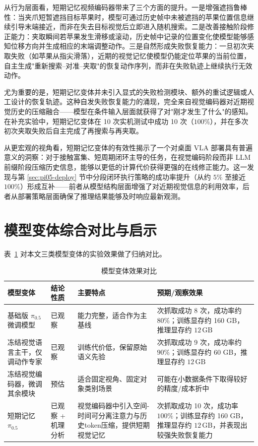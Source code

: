 从行为层面看，短期记忆视频编码器带来了三个方面的提升。一是增强遮挡鲁棒性：当夹爪短暂遮挡目标苹果时，模型可通过历史帧中未被遮挡的苹果位置信息继续引导末端接近，而非在失去目标视觉后立即进入随机搜索。二是改善接触阶段修正能力：夹取瞬间若苹果发生滑移或滚动，历史帧中记录的位置变化使模型能够感知位移方向并生成相应的末端调整动作。三是自然形成失败恢复能力：一旦初次夹取失败（如苹果从指尖滑落），近期的视觉记忆使模型仍能定位苹果的当前位置，自主生成"重新搜索--对准--夹取"的恢复动作序列，而非在失败轨迹上继续执行无效动作。

尤为重要的是，短期记忆变体并未引入显式的失败检测模块、额外的重试逻辑或人工设计的恢复轨迹。这种自发失败恢复能力的涌现，完全来自视觉编码器对近期视觉历史的压缩融合——模型在条件输入层面就获得了对"刚才发生了什么"的感知。在补充实验中，短期记忆变体在 10 次实机测试中成功 10 次（$100\%$），并在多次初次夹取失败后自主完成了再搜索与再夹取。

从更宏观的视角看，短期记忆变体的有效性揭示了一个对桌面 VLA 部署具有普遍意义的洞察：对于接触富集、短周期闭环主导的任务，在视觉编码阶段而非 LLM 前缀阶段压缩历史信息，能够以更低的计算代价获得更强的在线修正能力。这一发现与第 \ref{sec:pi05-deploy} 节中分段闭环执行策略的成功率提升（从约 $5\%$ 至接近 $100\%$）形成互补——前者从模型结构层面增强了对近期视觉信息的利用效率，后者从部署策略层面确保了推理结果能够及时响应最新观测。

\section{模型变体综合对比与启示}
\label{sec:variant-comparison}

表~\ref{tab:variant-analysis} 对本文三类模型变体的实验效果做了归纳对比。

\begin{table}[htbp]
  \centering
  \small
  \caption{模型变体效果对比}
  \label{tab:variant-analysis}
  \begin{tabular}{>{\raggedright\arraybackslash}p{3.0cm}>{\raggedright\arraybackslash}p{1.9cm}>{\raggedright\arraybackslash}p{3.5cm}>{\raggedright\arraybackslash}p{4.4cm}}
    \toprule
    模型变体 & 结论性质 & 主要特点 & 预期/观察效果 \\
    \midrule
    基础版 $\pi_{0.5}$ 微调模型 & 已观察 & 能力完整，适合作为主基线 & 10 次抓取成功 8 次，成功率约 $80\%$；训练显存约 160 GB，推理显存约 $12\,\mathrm{GB}$ \\
    冻结视觉语言主干，仅调动作专家 & 已观察 & 训练代价低，保留原始语义先验 & 10 次抓取成功 9 次，成功率约 $90\%$；训练显存约 60 GB，推理显存约 $12\,\mathrm{GB}$ \\
    冻结视觉编码器，微调其余模块 & 预估 & 适合固定视角、固定对象类别场景 & 可能在小数据条件下取得较好的精度/成本折中 \\
    短期记忆 $\pi_{0.5}$ & 已观察 + 机理分析 & 视觉编码器中引入空间-时间可分离注意力与历史token压缩，提供短期视觉记忆 & 10 次抓取成功 10 次，成功率 $100\%$；训练显存约 160 GB，推理显存约 $12\,\mathrm{GB}$，并表现出较强失败恢复能力 \\
    \bottomrule
  \end{tabular}
\end{table}

